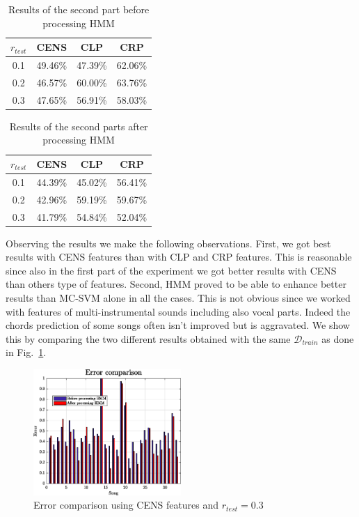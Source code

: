 \begin{table}[h!]
	\caption{Results of the second part before processing HMM}
	\centering
	\begin{tabular}{|c |c c c|}
	\hline
	$r_{test}$ & CENS & CLP & CRP\\ \hline
	0.1 & 49.46\% & 47.39\% & 62.06\%\\
	0.2 & 46.57\% & 60.00\% & 63.76\%\\
	0.3 & 47.65\% & 56.91\% & 58.03\%\\
	\hline
	\end{tabular}
	\label{tab:resultbeforeHMM}
\end{table}

\begin{table}[h!]
	\caption{Results of the second parts after processing HMM}
	\centering
	\begin{tabular}{|c |c c c|}
	\hline
	$r_{test}$ & CENS & CLP & CRP\\ \hline
	0.1 & 44.39\% & 45.02\% & 56.41\%\\
	0.2 & 42.96\% & 59.19\% & 59.67\%\\
	0.3 & 41.79\% & 54.84\% & 52.04\%\\
	\hline
	\end{tabular}
	\label{tab:resultafterHMM}
\end{table}

 Observing the results we make the following observations. First, we got best results with CENS features than with CLP and CRP features. This is reasonable since also in the first part of the experiment we got better results with CENS than others type of features. Second, HMM proved to be able to enhance better results than MC-SVM alone in all the cases. This is not obvious since we worked with features of multi-instrumental sounds including also vocal parts. Indeed the chords prediction of some songs often isn't improved but is aggravated. We show this by comparing the two different results obtained with the same $\mathcal{D}_{train}$ as done in Fig.~\ref{fig:compareerror}.

\begin{figure} [h!]
	\includegraphics[width=0.5\textwidth]{img/Result_HMM/CENS/plot03071}
	\caption{Error comparison using CENS features and $r_{test}=0.3$}
	\label{fig:compareerror}
\end{figure}


